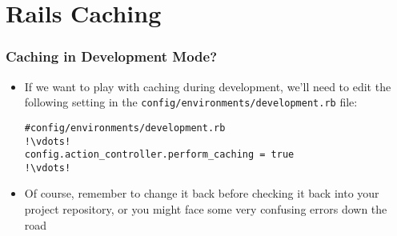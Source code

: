\documentclass{beamer}
\begin{document}
\section{Rails Caching}
\begin{frame}[fragile]
\frametitle{Caching in Development Mode?}
\begin{itemize}
\item If we want to play with caching during development, we’ll need to edit the following setting in the \texttt{config/environments/development.rb} file:

\lstset{language=shell}
\begin{lstlisting}[escapechar=!]
#config/environments/development.rb
!\vdots!
config.action_controller.perform_caching = true
!\vdots!
\end{lstlisting}

\item Of course, remember to change it back before checking it back into your project repository,
or you might face some very confusing errors down the road
\end{itemize}

\end{frame}
\end{document}
